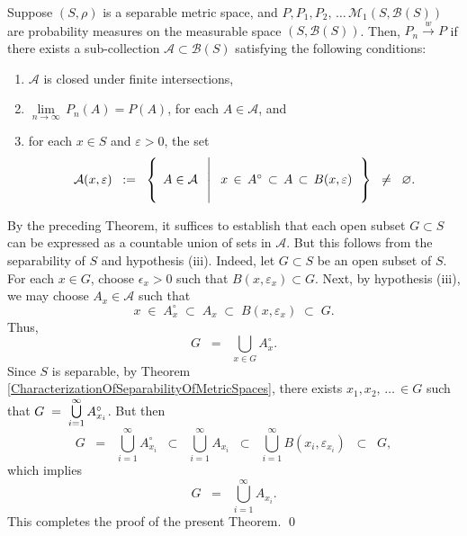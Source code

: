 \begin{theorem}
\mbox{}
\vskip 0.1cm
\noindent
Suppose $\left(S,\rho\right)$ is a {\color{red}separable} metric space, and
$P, P_{1}, P_{2}, \,\ldots\,\mathcal{M}_{1}\!\left(S,\mathcal{B}(S)\right)$
are probability measures on the measurable space $\left(S,\mathcal{B}(S)\right)$.
Then, $P_{n} \overset{w}{\longrightarrow} P$ if there exists a sub-collection
$\mathcal{A} \subset \mathcal{B}(S)$ satisfying the following conditions:
\begin{enumerate}
\item	$\mathcal{A}$ is closed under finite intersections,
\item	$\underset{n\rightarrow\infty}{\lim}\,P_{n}(A) = P(A)$, for each $A \in \mathcal{A}$, and
\item	for each $x \in S$ and $\varepsilon > 0$, the set
		\begin{equation*}
		\mathcal{A}(x,\varepsilon)
		\;\; := \;\;
		\left\{\;\,
		A \in \mathcal{A}
		\;\;\left\vert\;
		\begin{array}{c}
			\\
			x \,\in\, A^{\circ} \,\subset\, A \,\subset\, B(x,\varepsilon)
			\\ \\
		\end{array}
		\right.
		\right\}
		\;\; \neq \;\; \varnothing.
		\end{equation*}
\end{enumerate}
\end{theorem}
\proof
\vskip 0.1cm
\noindent
By the preceding Theorem, it suffices to establish that
each open subset $G \subset S$ can be expressed as a countable union of sets in $\mathcal{A}$.
But this follows from the separability of $S$ and hypothesis (iii).
Indeed, let $G \subset S$ be an open subset of $S$.
For each $x \in G$, choose $\epsilon_{x} > 0$ such that $B(x,\varepsilon_{x}) \subset G$.
Next, by hypothesis (iii), we may choose $A_{x} \in \mathcal{A}$ such that
\begin{equation*}
	x \;\in\; A_{x}^{\circ} \;\subset\; A_{x} \;\subset\; B(x,\varepsilon_{x}) \;\subset\; G.
\end{equation*}
Thus,
\begin{equation*}
G \;\; = \;\; \bigcup_{x \in G} A_{x}^{\circ}.
\end{equation*}
Since $S$ is separable, by Theorem \ref{CharacterizationOfSeparabilityOfMetricSpaces},
there exists $x_{1}, x_{2}, \,\ldots\, \in G$ such that
$G \; = \; \overset{\infty}{\underset{i=1}{\textnormal{\large$\bigcup$}}}\,A_{x_{i}}^{\circ}$.
But then
\begin{equation*}
G
\;\; = \;\; \bigcup_{i=1}^{\infty} A_{x_{i}}^{\circ}
\;\; \subset \;\; \bigcup_{i=1}^{\infty} A_{x_{i}}
\;\; \subset \;\; \bigcup_{i=1}^{\infty} B(x_{i},\varepsilon_{x_{i}})
\;\; \subset \;\; G,
\end{equation*}
which implies
\begin{equation*}
G \;\; = \;\; \bigcup_{i=1}^{\infty} A_{x_{i}}.
\end{equation*}
This completes the proof of the present Theorem.
\qed


